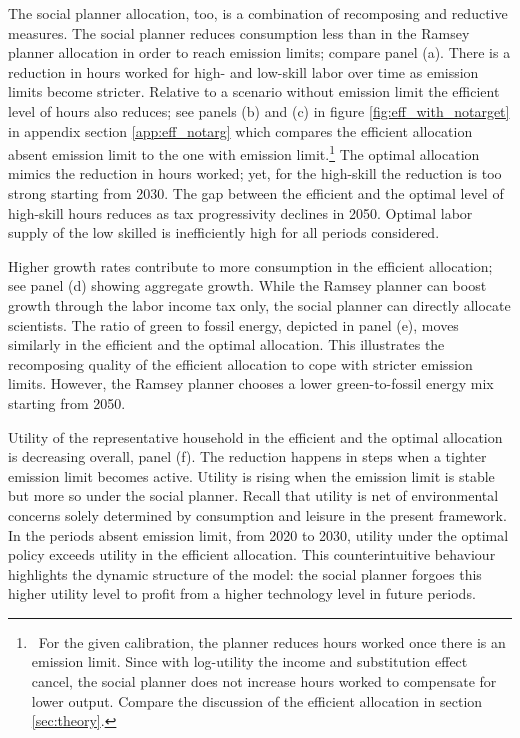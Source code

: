 The social planner allocation, too, is a combination of recomposing and reductive measures. 
The social planner reduces consumption less than in the Ramsey planner allocation in order to reach emission limits; compare panel (a). There is a reduction in hours worked for high- and low-skill labor over time as emission limits become stricter. Relative to a scenario without emission limit the efficient level of hours also reduces; see panels (b) and (c) in figure \ref{fig:eff_with_notarget} in appendix section \ref{app:eff_notarg} which compares the efficient allocation absent emission limit to the one with emission limit.\footnote{\ For the given calibration, the planner reduces hours worked once there is an emission limit. Since with log-utility the income and substitution effect cancel, the social planner does not increase hours worked to compensate for lower output. Compare the discussion of the efficient allocation in section \ref{sec:theory}.} 
The optimal allocation mimics the reduction in hours worked; yet, for the high-skill the reduction is too strong starting from 2030. The gap between the efficient and the optimal level of high-skill hours reduces as tax progressivity declines in 2050. Optimal labor supply of the low skilled is inefficiently high for all periods considered.

Higher growth rates contribute to more consumption in the efficient allocation; see panel (d) showing aggregate growth. While the Ramsey planner can boost growth through the labor income tax only, the social planner can directly allocate scientists. The ratio of green to fossil energy, depicted in panel (e), moves similarly in the efficient and the optimal allocation. This illustrates the recomposing quality of the efficient allocation to cope with stricter emission limits. However, the Ramsey planner chooses a lower green-to-fossil energy mix starting from 2050. 

Utility of the representative household in the efficient and the optimal allocation is decreasing overall, panel (f). The reduction happens in steps when a tighter emission limit becomes active. Utility is rising when the emission limit is stable but more so under the social planner. Recall that utility is net of environmental concerns solely determined by consumption and leisure in the present framework. In the periods absent emission limit, from 2020 to 2030, utility under the optimal policy exceeds utility in the efficient allocation. This counterintuitive behaviour highlights the dynamic structure of the model: the social planner forgoes this higher utility level to profit from a higher technology level in future periods.



